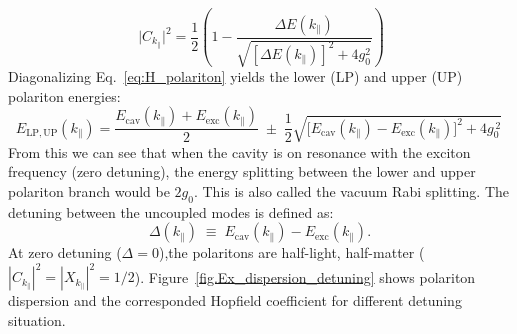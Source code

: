 \begin{equation}\
\lvert C_{k_\parallel}\rvert^{2}
= \frac{1}{2}\!\left(
1 - \frac{\Delta E(k_\parallel)}{\sqrt{[\Delta E(k_\parallel)]^{2}+4 g_0^{2}}}
\right)
\label{eq:Hopcoefficient_Ck}
\end{equation}
Diagonalizing Eq.~\eqref{eq:H_polariton} yields the lower (LP) and upper (UP) polariton energies\cite{Rahimi-Iman2020-tt,Deng2010-ul}:
\begin{equation}
E_{\mathrm{LP,UP}}(k_{\parallel})
=
\frac{E_{\mathrm{cav}}(k_{\parallel}) + E_{\mathrm{exc}}(k_{\parallel})}{2}
\;\pm\;
\frac{1}{2}\sqrt{\big[E_{\mathrm{cav}}(k_{\parallel}) - E_{\mathrm{exc}}(k_{\parallel})\big]^2 + 4 g_0^{\,2}}\, 
\label{eq:LP_UP}
\end{equation}
From this we can see that when the cavity is on resonance with the exciton frequency (zero detuning), the energy splitting between the lower and upper polariton branch would be $2g_0$. This is also called the vacuum Rabi splitting.
The detuning between the uncoupled modes is defined as\cite{Deng2010-ul}:
\begin{equation}
\Delta(k_{\parallel}) \;\equiv\; E_{\mathrm{cav}}(k_{\parallel}) - E_{\mathrm{exc}}(k_{\parallel}) .
\label{eq:detuning}
\end{equation}
At zero detuning ($\Delta=0$),the polaritons are half-light, half-matter ($|C_{k_{\parallel}}|^{2}=|X_{k_{\parallel}}|^{2}=1/2$).
Figure~\ref{fig.Ex_dispersion_detuning} shows polariton dispersion and the corresponded Hopfield coefficient for different detuning situation.

